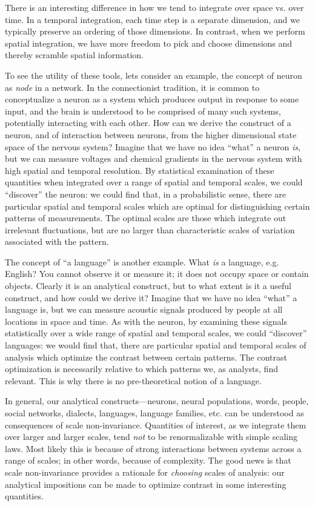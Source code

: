   There is an interesting difference in how we tend to integrate over space vs. over time. In a temporal integration, each time step is a separate dimension, and we typically preserve an ordering of those dimensions. In contrast, when we perform spatial integration, we have more freedom to pick and choose dimensions and thereby scramble spatial information.

To see the utility of these tools, lets consider an example, the concept of neuron as \textit{node} in a network. In the connectionist tradition, it is common to conceptualize a neuron as a system which produces output in response to some input, and the brain is understood to be comprised of many such systems, potentially interacting with each other. How can we derive the construct of a neuron, and of interaction between neurons, from the higher dimensional state space of the nervous system? Imagine that we have no idea “what” a neuron \textit{is}, but we can measure voltages and chemical gradients in the nervous system with high spatial and temporal resolution. By statistical examination of these quantities when integrated over a range of spatial and temporal scales, we could “discover” the neuron: we could find that, in a probabilistic sense, there are particular spatial and temporal scales which are optimal for distinguishing certain patterns of measurements. The optimal scales are those which integrate out irrelevant fluctuations, but are no larger than characteristic scales of variation associated with the pattern.

  The concept of “a language” is another example. What \textit{is} a language, e.g. English? You cannot observe it or measure it; it does not occupy space or contain objects. Clearly it is an analytical construct, but to what extent is it a useful construct, and how could we derive it? Imagine that we have no idea “what” a language is, but we can measure acoustic signals produced by people at all locations in space and time. As with the neuron, by examining these signals statistically over a wide range of spatial and temporal scales, we could “discover” languages: we would find that, there are particular spatial and temporal scales of analysis which optimize the contrast between certain patterns. The contrast optimization is necessarily relative to which patterns we, as analysts, find relevant. This is why there is no pre-theoretical notion of a language.

  In general, our analytical constructs—neurons, neural populations, words, people, social networks, dialects, languages, language families, etc. can be understood as consequences of scale non-invariance. Quantities of interest, as we integrate them over larger and larger scales, tend \textit{not} to be renormalizable with simple scaling laws. Most likely this is because of strong interactions between systems across a range of scales; in other words, because of complexity. The good news is that scale non-invariance provides a rationale for \textit{choosing} scales of analysis: our analytical impositions can be made to optimize contrast in some interesting quantities.

